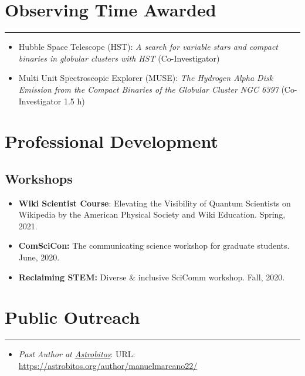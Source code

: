 \documentclass[letterpaper,10pt]{article}
\begin{document}
\section*{Observing Time Awarded }       

\hrule
\vspace{.3 cm}


  \begin{itemize}[label=$\blacktriangleright$]
      \item Hubble Space Telescope (HST): \emph{ A search for variable stars and compact binaries in globular clusters with HST } (Co-Investigator)
  \end{itemize}




  \begin{itemize}[label=$\blacktriangleright$]
        \item Multi Unit Spectroscopic Explorer (MUSE): \emph{The Hydrogen Alpha Disk Emission from the Compact Binaries of the Globular Cluster NGC 6397} (Co-Investigator 1.5 h)
  \end{itemize}



\section*{Professional Development}
\subsection*{Workshops}
\begin{itemize}[label=$\blacktriangleright$]
    \item  \textbf{Wiki Scientist Course}: Elevating the Visibility of Quantum Scientists on Wikipedia by the American Physical Society and Wiki Education. Spring, 2021.
    \item \textbf{ComSciCon:} The communicating science workshop for graduate students. June, 2020.
    \item \textbf{Reclaiming STEM:} Diverse \& inclusive SciComm workshop. Fall, 2020.
\end{itemize}


\section*{Public Outreach}
\hrule
\vspace{.3 cm}
\begin{itemize}[label=$\blacktriangleright$]
\item \emph{Past Author at \href{https://astrobitos.org/}{Astrobitos}}: URL: \url{https://astrobitos.org/author/manuelmarcano22/}
\end{itemize}
\end{document}
